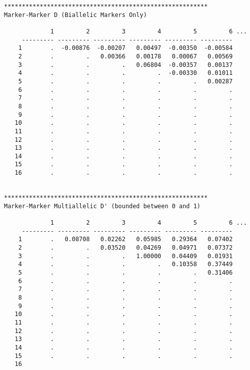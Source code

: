 \begin{verbatim}
*********************************************************
Marker-Marker D (Biallelic Markers Only)

             1         2         3         4         5         6 ...
     --------- --------- --------- --------- --------- --------- 
    1        .  -0.00876  -0.00207   0.00497  -0.00350  -0.00584 
    2        .         .   0.00366   0.00178   0.00067   0.00569 
    3        .         .         .   0.06804  -0.00357   0.00137 
    4        .         .         .         .  -0.00330   0.01011 
    5        .         .         .         .         .   0.00287 
    6        .         .         .         .         .         . 
    7        .         .         .         .         .         . 
    8        .         .         .         .         .         . 
    9        .         .         .         .         .         . 
   10        .         .         .         .         .         . 
   11        .         .         .         .         .         . 
   12        .         .         .         .         .         . 
   13        .         .         .         .         .         . 
   14        .         .         .         .         .         . 
   15        .         .         .         .         .         . 
   16        .         .         .         .         .         . 


*********************************************************
Marker-Marker Multiallelic D' (bounded between 0 and 1)

             1         2         3         4         5         6 ...
     --------- --------- --------- --------- --------- --------- 
    1        .   0.08708   0.02262   0.05985   0.29364   0.07402 
    2        .         .   0.03520   0.04269   0.04971   0.07372 
    3        .         .         .   1.00000   0.04409   0.01931 
    4        .         .         .         .   0.10358   0.37449 
    5        .         .         .         .         .   0.31406 
    6        .         .         .         .         .         . 
    7        .         .         .         .         .         . 
    8        .         .         .         .         .         . 
    9        .         .         .         .         .         . 
   10        .         .         .         .         .         . 
   11        .         .         .         .         .         . 
   12        .         .         .         .         .         . 
   13        .         .         .         .         .         . 
   14        .         .         .         .         .         . 
   15        .         .         .         .         .         . 
   16       


\end{verbatim}
